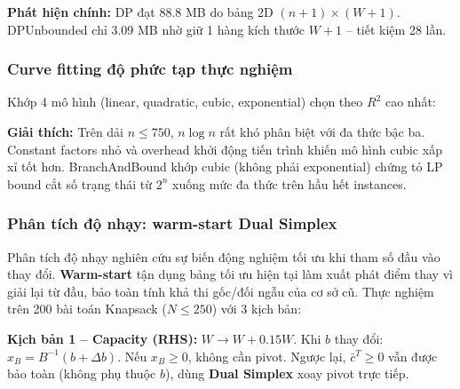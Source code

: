 \textbf{Phát hiện chính:} DP đạt 88.8 MB do bảng 2D $(n+1)\times(W+1)$. DPUnbounded chỉ 3.09 MB nhờ giữ 1 hàng kích thước $W+1$ -- tiết kiệm 28 lần.

\FloatBarrier
\subsubsection{Curve fitting độ phức tạp thực nghiệm}

Khớp 4 mô hình (linear, quadratic, cubic, exponential) chọn theo $R^2$ cao nhất:

\begin{table}[H]
\centering
\caption{Khớp đường cong cho các thuật toán tiêu biểu.}
\label{tab:curvefit}
\end{table}

\textbf{Giải thích:} Trên dải $n\le 750$, $n\log n$ rất khó phân biệt với đa thức bậc ba. Constant factors nhỏ và overhead khởi động tiến trình khiến mô hình cubic xấp xỉ tốt hơn. BranchAndBound khớp cubic (không phải exponential) chứng tỏ LP bound cắt số trạng thái từ $2^n$ xuống mức đa thức trên hầu hết instances.

\FloatBarrier
\subsubsection{Phân tích độ nhạy: warm-start Dual Simplex}
\label{subsubsec:sensitivity}

Phân tích độ nhạy nghiên cứu sự biến động nghiệm tối ưu khi tham số đầu vào thay đổi. \textbf{Warm-start} tận dụng bảng tối ưu hiện tại làm xuất phát điểm thay vì giải lại từ đầu, bảo toàn tính khả thi gốc/đối ngẫu của cơ sở cũ. Thực nghiệm trên 200 bài toán Knapsack ($N\le 250$) với 3 kịch bản:

\textbf{Kịch bản 1 -- Capacity (RHS):} $W \to W + 0.15W$. Khi $b$ thay đổi: $x_B = B^{-1}(b+\Delta b)$. Nếu $x_B\ge 0$, không cần pivot. Ngược lại, $\bar{c}^T \ge 0$ vẫn được bảo toàn (không phụ thuộc $b$), dùng \textbf{Dual Simplex} xoay pivot trực tiếp.

